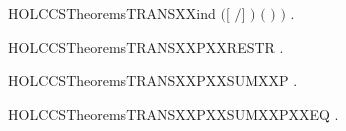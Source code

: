\begin{SaveVerbatim}{HOLCCSTheoremsTRANSXXind}
             \ensuremath{(}\ensuremath{[}  \ensuremath{/}\ensuremath{]} \ensuremath{)}   \HOLSymConst{\HOLTokenImp{}}  \ensuremath{(}  \ensuremath{)}  \ensuremath{)} \HOLSymConst{\HOLTokenImp{}}
       \HOLSymConst{\HOLTokenForall{}}  .  \HOLTokenTransBegin{}\HOLTokenTransEnd {} \HOLSymConst{\HOLTokenImp{}}    
\end{SaveVerbatim}
\newcommand{\HOLCCSTheoremsTRANSXXind}{\UseVerbatim{HOLCCSTheoremsTRANSXXind}}
\begin{SaveVerbatim}{HOLCCSTheoremsTRANSXXPXXRESTR}
\HOLTokenTurnstile{} \HOLSymConst{\HOLTokenForall{}}   .    \HOLTokenTransBegin{}\HOLTokenTransEnd {}   \HOLSymConst{\HOLTokenImp{}}  \HOLTokenTransBegin{}\HOLTokenTransEnd {}
\end{SaveVerbatim}
\newcommand{\HOLCCSTheoremsTRANSXXPXXRESTR}{\UseVerbatim{HOLCCSTheoremsTRANSXXPXXRESTR}}
\begin{SaveVerbatim}{HOLCCSTheoremsTRANSXXPXXSUMXXP}
\HOLTokenTurnstile{} \HOLSymConst{\HOLTokenForall{}}  .  \HOLSymConst{\ensuremath{+}}  \HOLTokenTransBegin{}\HOLTokenTransEnd {} \HOLSymConst{\HOLTokenImp{}}  \HOLTokenTransBegin{}\HOLTokenTransEnd {}
\end{SaveVerbatim}
\newcommand{\HOLCCSTheoremsTRANSXXPXXSUMXXP}{\UseVerbatim{HOLCCSTheoremsTRANSXXPXXSUMXXP}}
\begin{SaveVerbatim}{HOLCCSTheoremsTRANSXXPXXSUMXXPXXEQ}
\HOLTokenTurnstile{} \HOLSymConst{\HOLTokenForall{}}  .  \HOLSymConst{\ensuremath{+}}  \HOLTokenTransBegin{}\HOLTokenTransEnd {} \HOLSymConst{\HOLTokenEquiv{}}  \HOLTokenTransBegin{}\HOLTokenTransEnd {}
\end{SaveVerbatim}
